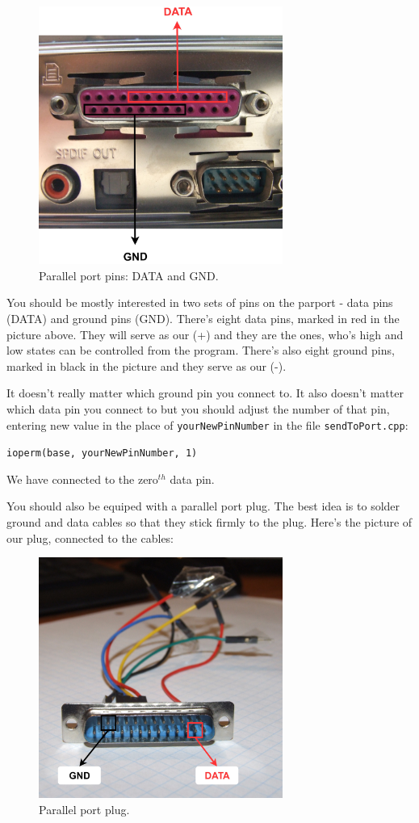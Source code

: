 \documentclass[12pt]{report}
\begin{document}
\begin{figure}[H]
\centering\includegraphics[width=8cm]{par_port}
\caption{Parallel port pins: DATA and GND.}				
\label{fig:par_port}
\end{figure}

You should be mostly interested in two sets of pins on the parport - data pins (DATA) and ground pins (GND). There's eight data pins, marked in red in the picture above. They will serve as our (+) and they are the ones, who's high and low states can be controlled from the program. There's also eight ground pins, marked in black in the picture and they serve as our (-).

It doesn't really matter which ground pin you connect to. It also doesn't matter which data pin you connect to but you should adjust the number of that pin, entering new value in the place of \verb|yourNewPinNumber| in the file \verb|sendToPort.cpp|:

\begin{snugshade}
\verb|ioperm(base, yourNewPinNumber, 1)|
\end{snugshade}


We have connected to the zero$^{th}$ data pin.

You should also be equiped with a parallel port plug. The best idea is to solder ground and data cables so that they stick firmly to the plug. Here's the picture of our plug, connected to the cables:

\begin{figure}[H]
\centering\includegraphics[width=8cm]{parport_plug}
\caption{Parallel port plug.}				
\label{fig:parport_plug}
\end{figure}
\end{document}
